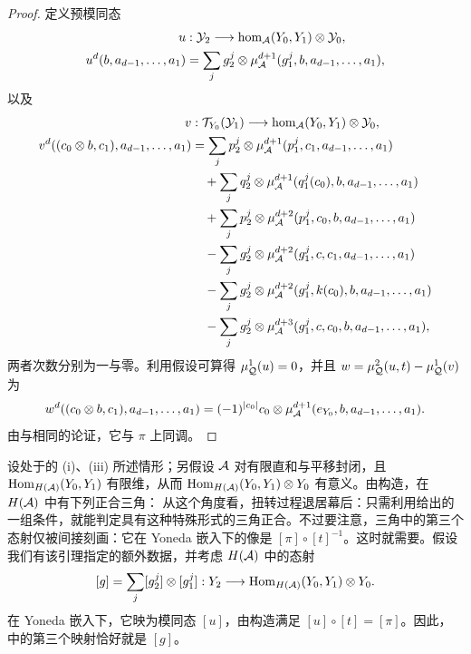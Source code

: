\begin{proof}
定义预模同态
\[
\begin{aligned}
u&:\mathcal Y_2\longrightarrow\hom_{\mathcal A}(Y_0,Y_1)\otimes\mathcal Y_0,\\
u^d(b,a_{d-1},\ldots,a_1)&=\sum_jg_2^j\otimes\mu^{d+1}_{\mathcal A}(g_1^j,b,a_{d-1},\ldots,a_1),
\end{aligned}
\]
以及
\[
\begin{aligned}
v&:\mathcal T_{Y_0}(\mathcal Y_1)\longrightarrow\hom_{\mathcal A}(Y_0,Y_1)\otimes\mathcal Y_0,\\
v^d((c_0\otimes b,c_1),a_{d-1},\ldots,a_1)
&=\sum_jp_2^j\otimes\mu^{d+1}_{\mathcal A}(p_1^j,c_1,a_{d-1},\ldots,a_1)\\
&\quad+\sum_jq_2^j\otimes\mu^{d+1}_{\mathcal A}(q_1^j(c_0),b,a_{d-1},\ldots,a_1)\\
&\quad+\sum_jp_2^j\otimes\mu^{d+2}_{\mathcal A}(p_1^j,c_0,b,a_{d-1},\ldots,a_1)\\
&\quad-\sum_jg_2^j\otimes\mu^{d+2}_{\mathcal A}(g_1^j,c,c_1,a_{d-1},\ldots,a_1)\\
&\quad-\sum_jg_2^j\otimes\mu^{d+2}_{\mathcal A}(g_1^j,k(c_0),b,a_{d-1},\ldots,a_1)\\
&\quad-\sum_jg_2^j\otimes\mu^{d+3}_{\mathcal A}(g_1^j,c,c_0,b,a_{d-1},\ldots,a_1),
\end{aligned}
\]
两者次数分别为一与零。利用假设可算得 $\mu^1_{\mathcal Q}(u)=0$，并且 $w=\mu^2_{\mathcal Q}(u,t)-\mu^1_{\mathcal Q}(v)$ 为
\[
w^d((c_0\otimes b,c_1),a_{d-1},\ldots,a_1)=(-1)^{|c_0|}c_0\otimes\mu^{d+1}_{\mathcal A}(e_{Y_0},b,a_{d-1},\ldots,a_1).
\]
由与相同的论证，它与 $\pi$ 上同调。
\end{proof}

\begin{note}\label{st:5.5}
设处于的 (i)、(iii) 所述情形；另假设 $\mathcal A$ 对有限直和与平移封闭，且 $\operatorname{Hom}_{H(\mathcal A)}(Y_0,Y_1)$ 有限维，从而 $\operatorname{Hom}_{H(\mathcal A)}(Y_0,Y_1)\otimes Y_0$ 有意义。由构造，在 $H(\mathcal A)$ 中有下列正合三角：
从这个角度看，扭转过程退居幕后：只需利用给出的一组条件，就能判定具有这种特殊形式的三角正合。不过要注意，三角中的第三个态射仅被间接刻画：它在 Yoneda 嵌入下的像是 $[\pi]\circ[t]^{-1}$。这时就需要。假设我们有该引理指定的额外数据，并考虑 $H(\mathcal A)$ 中的态射
\[
[g]=\sum_j[g_2^j]\otimes[g_1^j]:Y_2\longrightarrow\operatorname{Hom}_{H(\mathcal A)}(Y_0,Y_1)\otimes Y_0.
\]
在 Yoneda 嵌入下，它映为模同态 $[u]$，由构造满足 $[u]\circ[t]=[\pi]$。因此，中的第三个映射恰好就是 $[g]$。
\end{note}

